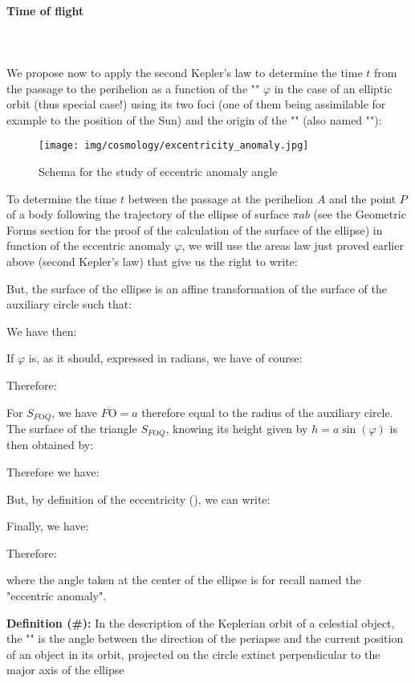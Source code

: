 	\paragraph{Time of flight}\mbox{}\\\\
	We propose now to apply the second Kepler's law to determine the time $t$ from the passage to the perihelion as a function of the "" $\varphi$ in the case of an elliptic orbit  (thus special case!) using its two foci (one of them being assimilable for example to the position of the Sun) and the origin of the "" (also named ""):
	\begin{figure}[H]
		\centering
		\texttt{[image: img/cosmology/excentricity\_anomaly.jpg]}	
		\caption{Schema for the study of eccentric anomaly angle}
	\end{figure}
	To determine the time $t$ between the passage at the perihelion $A$ and the point $P$ of a body following the trajectory of the ellipse of surface $\pi a b$ (see the Geometric Forms section for the proof of the calculation of the surface of the ellipse) in function of the eccentric anomaly $\varphi$, we will use the areas law just proved earlier above (second Kepler's law) that give us the right to write:
	
	But, the surface of the ellipse is an affine transformation of the surface of the auxiliary circle such that:
	
 	We have then:
	
 	If $\varphi$ is, as it should, expressed in radians, we have of course:
	
 	Therefore:
	
 	For $S_{F\text{O}Q}$, we have $\overline{F\text{O}}=a$ therefore equal to the radius of the auxiliary circle. The surface of the triangle $S_{F\text{O}Q}$, knowing its height given by $h=a\sin(\varphi)$ is then obtained by:
	
	Therefore we have:
	
	But, by definition of the eccentricity (), we can write:
	
	Finally, we have:
	
	Therefore:
	
 	where the angle taken at the center of the ellipse is for recall named the "eccentric anomaly".

	\textbf{Definition (\#\mydef):} In the description of the Keplerian orbit of a celestial object, the "" is the angle between the direction of the periapse and the current position of an object in its orbit, projected on the circle extinct perpendicular to the major axis of the ellipse

